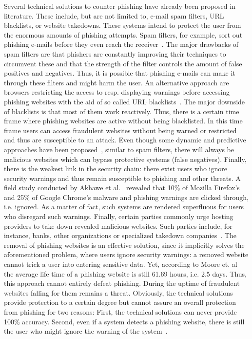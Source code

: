 Several technical solutions to counter phishing have already been proposed in literature.
These include, but are not limited to, e-mail spam filters, URL blacklists, or website takedowns.
These systems intend to protect the user from the enormous amounts of phishing attempts. 
Spam filters, for example, sort out phishing e-mails before they even reach the receiver~\cite{bergholz2010new,chandrasekaran2006phishing,fette2007learning}.
The major drawbacks of spam filters are that phishers are constantly improving their techniques to circumvent these and that the strength of the filter controls the amount of false positives and negatives. Thus, it is possible that phishing e-mails can make it through these filters and might harm the user.
An alternative approach are browsers restricting the access to resp. displaying warnings before accessing phishing websites with the aid of so called URL blacklists~\cite{ma2009beyond, zhang2008highly}.
The major downside of blacklists is that most of them work reactively.
Thus, there is a certain time frame where phishing websites are active without being blacklisted.
In this time frame users can access fraudulent websites without being warned or restricted and thus are susceptible to an attack.
Even though some dynamic and predictive approaches have been proposed~\cite{prakash2010phishnet, obied2009fraudulent, balzarotti2012proactive}, similar to spam filters, there will always be malicious websites which can bypass protective systems (false negatives).
 Finally, there is the weakest link in the security chain: there exist users who ignore security warnings and thus remain susceptible to phishing and other threats.
A field study conducted by Akhawe et al.~\cite{akhawe2013alice} revealed that 10\% of Mozilla Firefox's and 25\% of Google Chrome's malware and phishing warnings are clicked through, i.e. ignored.
 As a matter of fact, such systems are rendered superfluous for users who disregard such warnings.
Finally, certain parties commonly urge hosting providers to take down revealed malicious websites.
Such parties include, for instance, banks, other organizations or specialized takedown companies~\cite{moore2007examining}.
 The removal of phishing websites is an effective solution, since it implicitly solves the aforementioned problem, where users ignore security warnings: a removed website cannot trick a user into entering sensitive data.
Yet, according to Moore et. al~\cite{moore2007examining} the average life time of a phishing website is still 61.69 hours, i.e. 2.5 days.
Thus, this approach cannot entirely defeat phishing. During the uptime of fraudulent websites falling for them remains a threat.
Obviously, the technical solutions provide protection to a certain degree but cannot assure an overall protection from phishing for two reasons:
First, the technical solutions can never provide 100\% accuracy.
Second, even if a system detects a phishing website, there is still the user who might ignore the warning of the system~\cite{akhawe2013alice}.

